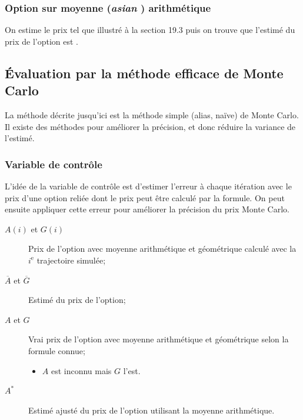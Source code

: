 \documentclass[10pt, french]{article}
\begin{document}
\begin{multicols*}{2}
\subsubsection*{Option sur moyenne (\og \textit{asian} \fg{}) arithmétique}
On estime le prix tel que illustré à la section 19.3 puis on trouve que l'estimé du prix de l'option est .


\columnbreak
\subsection{Évaluation par la méthode efficace de Monte Carlo}
La méthode décrite jusqu'ici est la méthode simple (alias, naïve) de Monte Carlo. Il existe des méthodes pour améliorer la précision, et donc réduire la variance de l'estimé.

\subsubsection*{Variable de contrôle}
L'idée de la variable de contrôle est d'estimer l'erreur à chaque itération avec le prix d'une option reliée dont le prix peut être calculé par la formule. On peut ensuite appliquer cette erreur pour améliorer la précision du prix Monte Carlo.

\begin{distributions}[Notation]
\begin{description}
	\item[$A(i)$ et $G(i)$]	Prix de l'option avec moyenne arithmétique et géométrique calculé avec la $i^{\text{e}}$ trajectoire simulée;
	\item[$\overline{A}$ et $\overline{G}$]	Estimé du prix de l'option;
	\item[$A$ et $G$]	Vrai prix de l'option avec moyenne arithmétique et géométrique selon la formule connue;	
		\begin{itemize}
		\item	$A$ est inconnu mais $G$ l'est.
		\end{itemize}
	\item[$A^{*}$]	Estimé ajusté du prix de l'option utilisant la moyenne arithmétique.
\end{description}
\end{distributions}


\end{multicols*}
\end{document}
